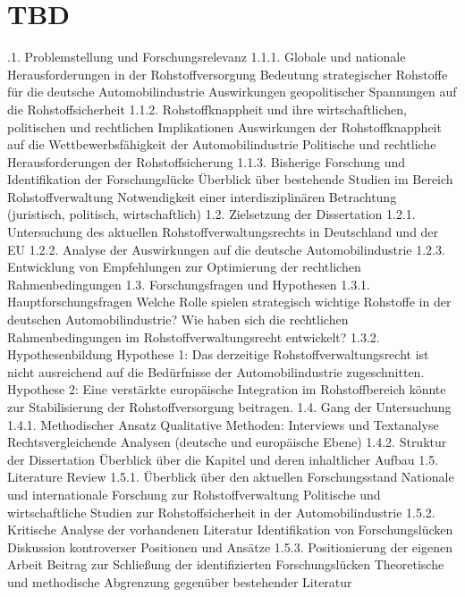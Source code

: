 \documentclass[12pt,a4paper,oneside]{book} %
\begin{document}
\section{TBD}
.1. Problemstellung und Forschungsrelevanz
1.1.1. Globale und nationale Herausforderungen in der Rohstoffversorgung
Bedeutung strategischer Rohstoffe für die deutsche Automobilindustrie
Auswirkungen geopolitischer Spannungen auf die Rohstoffsicherheit
1.1.2. Rohstoffknappheit und ihre wirtschaftlichen, politischen und rechtlichen Implikationen
Auswirkungen der Rohstoffknappheit auf die Wettbewerbsfähigkeit der Automobilindustrie
Politische und rechtliche Herausforderungen der Rohstoffsicherung
1.1.3. Bisherige Forschung und Identifikation der Forschungslücke
Überblick über bestehende Studien im Bereich Rohstoffverwaltung
Notwendigkeit einer interdisziplinären Betrachtung (juristisch, politisch, wirtschaftlich)
1.2. Zielsetzung der Dissertation
1.2.1. Untersuchung des aktuellen Rohstoffverwaltungsrechts in Deutschland und der EU
1.2.2. Analyse der Auswirkungen auf die deutsche Automobilindustrie
1.2.3. Entwicklung von Empfehlungen zur Optimierung der rechtlichen Rahmenbedingungen
1.3. Forschungsfragen und Hypothesen
1.3.1. Hauptforschungsfragen
Welche Rolle spielen strategisch wichtige Rohstoffe in der deutschen Automobilindustrie?
Wie haben sich die rechtlichen Rahmenbedingungen im Rohstoffverwaltungsrecht entwickelt?
1.3.2. Hypothesenbildung
Hypothese 1: Das derzeitige Rohstoffverwaltungsrecht ist nicht ausreichend auf die Bedürfnisse der Automobilindustrie zugeschnitten.
Hypothese 2: Eine verstärkte europäische Integration im Rohstoffbereich könnte zur Stabilisierung der Rohstoffversorgung beitragen.
1.4. Gang der Untersuchung
1.4.1. Methodischer Ansatz
Qualitative Methoden: Interviews und Textanalyse
Rechtsvergleichende Analysen (deutsche und europäische Ebene)
1.4.2. Struktur der Dissertation
Überblick über die Kapitel und deren inhaltlicher Aufbau
1.5. Literature Review
1.5.1. Überblick über den aktuellen Forschungsstand
Nationale und internationale Forschung zur Rohstoffverwaltung
Politische und wirtschaftliche Studien zur Rohstoffsicherheit in der Automobilindustrie
1.5.2. Kritische Analyse der vorhandenen Literatur
Identifikation von Forschungslücken
Diskussion kontroverser Positionen und Ansätze
1.5.3. Positionierung der eigenen Arbeit
Beitrag zur Schließung der identifizierten Forschungslücken
Theoretische und methodische Abgrenzung gegenüber bestehender Literatur

\printbibliography 
\end{document}

